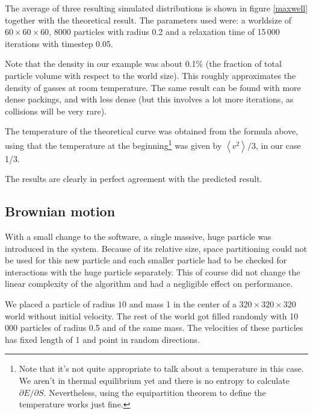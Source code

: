 The average of three  resulting simulated distributions is shown in figure 
\ref{maxwell} together with the theoretical result. The parameters used were: a 
worldsize of $60 \times 60 \times 60$, 8000 particles with radius 0.2 and a 
relaxation time of 15\,000 iterations with timestep 0.05.


Note that the density in our example was about 0.1\% (the fraction of total 
particle volume with respect to the world size). This roughly approximates 
the density of gasses at room temperature. The same result can be found 
with more dense packings, and with less dense (but this involves a lot more 
iterations, as collisions will be very rare).

The temperature of the theoretical curve was obtained from the formula 
above, using that the temperature at the beginning\footnote{Note that it's 
not quite appropriate to talk about a temperature in this case. We aren't 
in thermal equilibrium yet and there is no entropy to calculate $\partial E / 
\partial S$. Nevertheless, using the equipartition theorem to define the 
temperature works just fine.}
was given by $\left<v^2\right>/3$, in our case 1/3.

The results are clearly in perfect agreement with the predicted result.


\subsection{Brownian motion}
With a small change to the software, a single massive, huge particle was 
introduced in the system. Because of its relative size, space partitioning 
could not be used for this new particle and each smaller particle had to be 
checked for interactions with the huge particle separately. This of course 
did not change the linear complexity of the algorithm and had a negligible 
effect on performance.

We placed a particle of radius $10$ and mass 1 in the center of a $320 
\times 320 \times 320$ world without initial velocity. The rest of the 
world got filled randomly with 10\,000 particles of radius 0.5 and of the 
same mass. The velocities of these particles has fixed length of 1 and
point in random directions.


